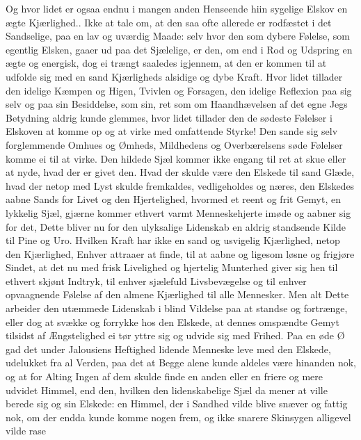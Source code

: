 \documentclass[12pt,a4paper]{book}
\newcommand{\apage}[1]{\marginnote{\footnotesize\textit{[#1]}}}
\begin{document}
Og hvor lidet er ogsaa endnu i mangen anden Henseende hiin sygelige
Elskov en ægte Kjærlighed.. Ikke at tale om, at den saa ofte allerede er
rodfæstet i det Sandselige, paa en lav og uværdig Maade: selv hvor den
som dybere Følelse, som egentlig Elsken, gaaer ud paa det Sjælelige, er
den, om end i Rod og Udspring en ægte og energisk, dog ei trængt
saaledes igjennem, at den er kommen til at udfolde sig med en sand
Kjærligheds alsidige og dybe Kraft. Hvor lidet tillader den idelige
Kæmpen og Higen, Tvivlen og \apage{125} Forsagen, den idelige Reflexion paa sig selv
og paa sin Besiddelse, som sin, ret som om Haandhævelsen af det egne
Jegs Betydning aldrig kunde glemmes, hvor lidet tillader den de sødeste
Følelser i Elskoven at komme op og at virke med omfattende Styrke! Den
sande sig selv forglemmende Omhues og Ømheds, Mildhedens og
Overbærelsens søde Følelser komme ei til at virke. Den hildede Sjæl
kommer ikke engang til ret at skue eller at nyde, hvad der er givet den.
Hvad der skulde være den Elskede til sand Glæde, hvad der netop med Lyst
skulde fremkaldes, vedligeholdes og næres, den Elskedes aabne Sands for
Livet og den Hjertelighed, hvormed et reent og frit Gemyt, en lykkelig
Sjæl, gjærne kommer ethvert varmt Menneskehjerte imøde og aabner sig for
det, Dette bliver nu for den ulyksalige Lidenskab en aldrig standsende
Kilde til Pine og Uro. Hvilken Kraft har ikke en sand og usvigelig
Kjærlighed, netop den Kjærlighed, Enhver attraaer at finde, til at aabne
og ligesom løsne og frigjøre Sindet, at det nu med frisk Livelighed og
hjertelig Munterhed giver sig hen til ethvert skjønt Indtryk, til enhver
sjælefuld Livsbevægelse og til enhver opvaagnende Følelse af den almene
Kjærlighed til alle Mennesker. Men alt Dette arbeider den utæmmede
Lidenskab i blind Vildelse paa at standse og fortrænge, eller dog at
svække og forrykke hos den Elskede, at dennes omspændte Gemyt tilsidst
af Ængstelighed ei tør yttre sig og udvide sig med Frihed. Paa en øde Ø
gad det under Jalousiens \apage{126} Heftighed lidende Menneske leve med den
Elskede, udelukket fra al Verden, paa det at Begge alene kunde aldeles
være hinanden nok, og at for Alting Ingen af dem skulde finde en anden
eller en friere og mere udvidet Himmel, end den, hvilken den
lidenskabelige Sjæl da mener at ville berede sig og sin Elskede: en
Himmel, der i Sandhed vilde blive snæver og fattig nok, om der endda
kunde komme nogen frem, og ikke snarere Skinsygen alligevel vilde rase
\end{document}
